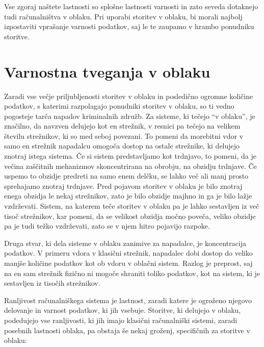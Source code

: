 \documentclass[12pt,a4paper,openany,tikz]{book}
\theoremstyle{plain}
\theoremstyle{definition}
\begin{document}
\noindent
Vse zgoraj naštete lastnosti so splošne lastnosti varnosti in zato seveda dotaknejo tudi računalništva v oblaku. Pri uporabi storitev v oblaku, bi morali najbolj izpostaviti vprašanje varnosti podatkov, saj le te zaupamo v hrambo ponudniku storitve.

\cleardoublepage
\chapter{Varnostna tveganja v oblaku}

Zaradi vse večje priljubljenosti storitev v oblaku in posledično ogromne količine podatkov, s katerimi razpolagajo ponudniki storitev v oblaku, so ti vedno pogosteje tarča napadov kriminalnih združb. Za sisteme, ki tečejo “v oblaku”, je značilno, da navzven delujejo kot en strežnik, v resnici pa tečejo na velikem številu strežnikov, ki so med seboj povezani. To pomeni da morebitni vdor v samo en strežnik napadalcu omogoča dostop na ostale strežnike, ki delujejo znotraj istega sistema. Če si sistem predstavljamo kot trdnjavo, to pomeni, da je večina zaščitnih mehanizmov skoncentrirana na obrobju, na obzidju trdnjave. Če uspemo to obzidje predreti na samo enem delčku, se lahko več ali manj prosto sprehajamo znotraj trdnjave. Pred pojavom storitev v oblaku je bilo znotraj enega obzidja le nekaj strežnikov, zato je bilo obzidje majhno in ga je bilo lažje vzdrževati. Sistem, na katerem teče storitev v oblaku pa je lahko sestavljen iz več tisoč strežnikov, kar pomeni, da se velikost obzidja močno poveča, veliko obzidje pa je tudi težko vzdrževati, zato se v njem hitro pojavijo razpoke.

Druga stvar, ki dela sisteme v oblaku zanimive za napadalce, je koncentracija podatkov. V primeru vdora v klasični strežnik, napadalec dobi dostop do veliko manjše količine podatkov kot ob vdoru v oblačni sistem. Razlog je preprost, saj na en sam strežnik fizično ni mogoče shraniti toliko podatkov, kot na sistem, ki je sestavljen iz tisočih strežnikov.

Ranljivost računalniškega sistema je lastnost, zaradi katere je ogroženo njegovo delovanje in varnost podatkov, ki jih vsebuje. Storitve, ki delujejo v oblaku,  podedujejo vse ranljivosti, ki jih imajo klasični računalniški sistemi, zaradi posebnih lastnosti oblaka, pa obstaja še nekaj groženj, specifičnih za storitve v oblaku:
\end{document}
